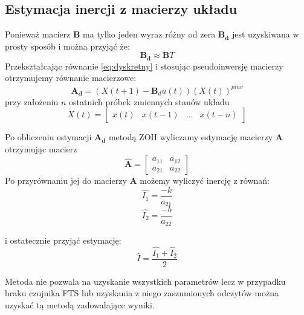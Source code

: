 \documentclass[12pt,a4paper]{article}
\begin{document}
	\subsection{Estymacja inercji z macierzy układu}
	\label{sec:pos}
	Ponieważ macierz $\mathbf{B}$ ma tylko jeden wyraz różny od zera $\mathbf{B_d}$ jest uzyskiwana w prosty sposób i można przyjąć że:
	\begin{equation}
	\mathbf{B_d} \approx \mathbf{B}T
	\end{equation}
	Przekształcając równanie \ref{eq:dyskretny} i stosując pseudoinwersję macierzy otrzymujemy równanie macierzowe:
	\begin{equation}
	\mathbf{A_d} = (X(t+1) - \mathbf{B}_du(t))(X(t))^{pinv}
	\label{eq:pinv}
	\end{equation}
	przy założeniu $n$ ostatnich próbek zmiennych stanów układu
	\begin{equation}
	X(t) = 	\begin{bmatrix}
	x(t) & x(t-1)  & ... & x(t-n)
	\end{bmatrix}
	\label{eq:xk}
	\end{equation}
	
	Po obliczeniu estymacji $\mathbf{A_d}$ metodą ZOH wyliczamy estymację macierzy $\mathbf{A}$ otrzymując macierz
	\begin{equation}
	\mathbf{\hat{A}} = 	\begin{bmatrix}
	a_{11} & a_{12}\\
	a_{21} & a_{22}
	\end{bmatrix}
	\end{equation}
	Po przyrównaniu jej do macierzy $\mathbf{A}$ możemy wyliczyć inercję z równań:
	\begin{equation}
	\hat{I_1} = \frac{-k}{a_{21}}
	\end{equation}
	\begin{equation}
	\hat{I_2} = \frac{-b}{a_{22}}
	\end{equation}
	
	i ostatecznie przyjąć estymację:
	\begin{equation}
	\hat{I} = \frac{\hat{I_1}+\hat{I_2}}{2}
	\end{equation}
	
	
	Metoda nie pozwala na uzyskanie wszystkich parametrów lecz w przypadku braku czujnika FTS lub uzyskania z niego zaszumionych odczytów można uzyskać tą metodą zadowalające wyniki.
	
\end{document}
